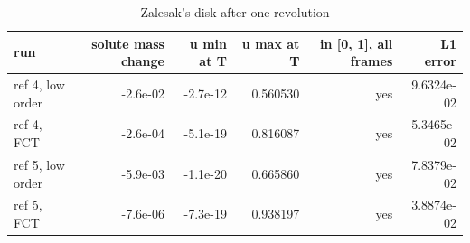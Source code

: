 \begin{table}[h]
\centering
\caption{Zalesak's disk after one revolution}
\begin{tabular}{lrrrrr}
\hline
run & solute mass change & u min at T & u max at T & in [0, 1], all frames & L1 error \\
\hline
ref 4, low order & -2.6e-02 & -2.7e-12 & 0.560530 & yes & 9.6324e-02 \\
ref 4, FCT & -2.6e-04 & -5.1e-19 & 0.816087 & yes & 5.3465e-02 \\
ref 5, low order & -5.9e-03 & -1.1e-20 & 0.665860 & yes & 7.8379e-02 \\
ref 5, FCT & -7.6e-06 & -7.3e-19 & 0.938197 & yes & 3.8874e-02 \\
\hline
\end{tabular}
\end{table}
